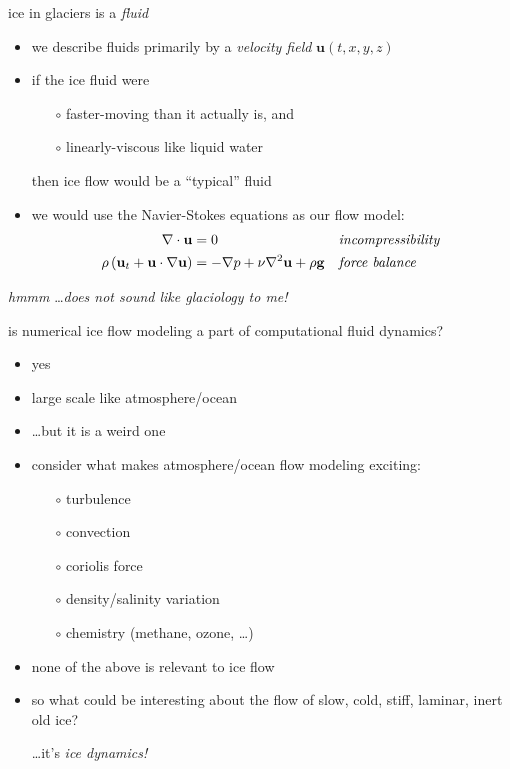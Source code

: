 \begin{frame}{ice in glaciers is a \emph{fluid}}

\begin{itemize}
\item we describe fluids primarily by a \emph{velocity field} $\mathbf{u}(t,x,y,z)$
\item if the ice fluid were
  \begin{itemize}
  \item[$\circ$] faster-moving than it actually is, and
  \item[$\circ$] linearly-viscous like liquid water
  \end{itemize}
  
  then ice flow would be a ``typical'' fluid
\item we would use the Navier-Stokes equations as our flow model:
\begin{align*}
\nabla \cdot \mathbf{u} &= 0 &&\text{\emph{incompressibility}} \\
\rho \left(\mathbf{u}_t + \mathbf{u}\cdot\nabla \mathbf{u}\right) &= -\nabla p + \nu \nabla^2 \mathbf{u} + \rho \mathbf{g} &&\text{\emph{force balance}}
\end{align*}
\end{itemize}
\end{frame}


\begin{frame}{\emph{hmmm} \dots \emph{does not sound like glaciology to me!}}

is numerical ice flow modeling a part of computational fluid dynamics?

\begin{itemize}
\item \alert{yes}
\item large scale like atmosphere/ocean
\item \dots but it is a weird one
\item consider what makes atmosphere/ocean flow modeling exciting:
  \begin{itemize}
  \item[$\circ$] turbulence
  \item[$\circ$] convection
  \item[$\circ$] coriolis force
  \item[$\circ$] density/salinity variation
  \item[$\circ$] chemistry (methane, ozone, \dots)
  \end{itemize}
\item none of the above is relevant to ice flow
\item so what could be interesting about the flow of slow, cold, stiff, laminar, inert old ice?

 \qquad \dots \qquad it's \emph{ice dynamics!}
\end{itemize}
\end{frame}


